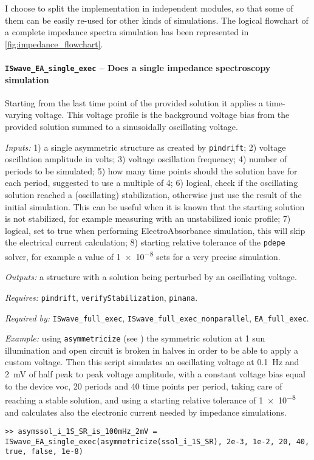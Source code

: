 	I choose to split the implementation in independent modules, so that some of them can be easily re-used for other kinds of simulations.
	The logical flowchart of a complete impedance spectra simulation has been represented in \cref{fig:impedance_flowchart}.


	\paragraph{\texttt{ISwave\_EA\_single\_exec} -- Does a single impedance spectroscopy simulation}
	Starting from the last time point of the provided solution it applies a time-varying voltage.
	This voltage profile is the background voltage bias from the provided solution summed to a sinusoidally oscillating voltage.

	\textit{Inputs:} 1) a single asymmetric structure as created by \texttt{pindrift};
	2) voltage oscillation amplitude in volts;
	3) voltage oscillation frequency;
	4) number of periods to be simulated;
	5) how many time points should the solution have for
	each period, suggested to use a multiple of 4;
	6) logical, check if the oscillating solution reached a
	(oscillating) stabilization, otherwise just use the result of the
	initial simulation. This can be useful when it is known that the
	starting solution is not stabilized, for example measuring with an
	unstabilized ionic profile;
	7) logical, set to true when performing ElectroAbsorbance simulation,
	this will skip the electrical current calculation;
	8) starting relative tolerance of the \texttt{pdepe} solver, for example a
	value of \num{1e-8} sets for a very precise simulation.

	\textit{Outputs:} a structure with a solution being perturbed by an
	oscillating voltage.

	\textit{Requires:} \texttt{pindrift}, \texttt{verify\-Stabilization}, \texttt{pinana}.

	\textit{Required by:} \texttt{ISwave\_full\_exec}, \texttt{ISwave\_full\_exec\_nonparallel}, \texttt{EA\_full\_exec}.

	\textit{Example:} using \texttt{asymmetricize} (see ) the symmetric solution at 1 sun illumination and open circuit is broken in halves in order to be able to apply a custom voltage.
	Then this script simulates an oscillating voltage at \SI{0.1}{\Hz} and \SI{2}{\mV} of half peak to peak voltage amplitude, with a constant voltage bias equal to the device \gls{voc},
	20 periods and 40 time points per period, taking care of reaching a stable solution,
	and using a starting relative tolerance of \num{1e-8} and calculates also the electronic current needed by impedance simulations.
	\begin{lstlisting}[style=Matlab-editor]
>> asymssol_i_1S_SR_is_100mHz_2mV = ISwave_EA_single_exec(asymmetricize(ssol_i_1S_SR), 2e-3, 1e-2, 20, 40, true, false, 1e-8)
   \end{lstlisting}

